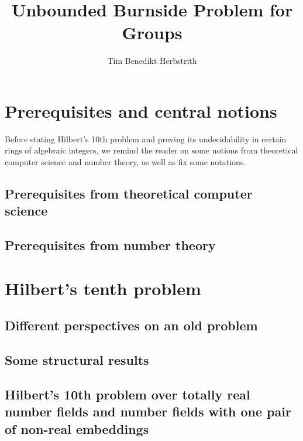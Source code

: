 \documentclass[10pt,a4paper]{scrbook}
\author{Tim Benedikt Herbstrith}
\title{Unbounded Burnside Problem for Groups}
\numberwithin{equation}{section}
\begin{document}

\allowdisplaybreaks

\frontmatter



\mainmatter
\onehalfspacing

\chapter{Prerequisites and central notions}

Before stating Hilbert's 10th problem and proving its undecidability in
certain rings of algebraic integers, we remind the reader on some
notions from theoretical computer science and number theory, as well as
fix some notations.

\section{Prerequisites from theoretical computer science}


\section{Prerequisites from number theory}


\chapter{Hilbert's tenth problem}

\section{Different perspectives on an old problem}


\section{Some structural results}


\section{Hilbert's 10th problem over totally real number fields and number fields with one pair of non-real embeddings}

\end{document}
